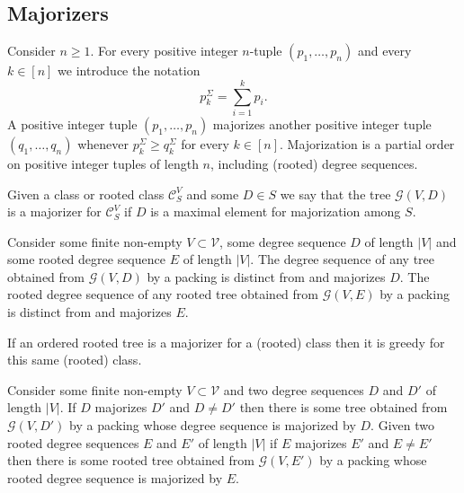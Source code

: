 \documentclass[11 pt]{modarticle}
\newcommand{\vset}{\mathcal{V}}
\newcommand{\size}[1]{|#1|}
\newcommand{\tclass}{\mathcal{C}}
\newcommand{\greedy}[2]{\mathcal{G}(#1,#2)}
\newcommand{\pclass}[2]{\tclass^{#1}_{#2}}
\begin{document}
\subsection{Majorizers}\label{section:majorization}

Consider $n \geq 1$. For every positive integer $n$-tuple $(p_1, \dots, p_n)$ and every $k \in [n]$ we introduce the notation
\begin{equation*}
	p^{\Sigma}_k = \underset{i=1}{\overset{k}{\sum}} p_i.
\end{equation*}
A positive integer tuple $(p_1, \dots, p_n)$ majorizes another positive integer tuple $(q_1, \dots, q_n)$ whenever $p^{\Sigma}_k \geq q^{\Sigma}_k$ for every $k \in [n]$. Majorization is a partial order on positive integer tuples of length $n$, including (rooted) degree sequences.%


\begin{defi}
Given a class or rooted class $\pclass{V}{S}$ and some $D \in S$ we say that the tree $\greedy{V}{D}$ is a majorizer for $\pclass{V}{S}$ if $D$ is a maximal element for majorization among $S$.
\end{defi}

\begin{rem}\label{rem:majorization}
Consider some finite non-empty $V \subset \vset$, some degree sequence $D$ of length $\size{V}$ and some rooted degree sequence $E$ of length $\size{V}$. The degree sequence of any tree obtained from $\greedy{V}{D}$ by a packing is distinct from and majorizes $D$. The rooted degree sequence of any rooted tree obtained from $\greedy{V}{E}$ by a packing is distinct from and majorizes $E$. 
\end{rem}

\begin{cor}\label{cor:majorization}
If an ordered rooted tree is a majorizer for a (rooted) class then it is greedy for this same (rooted) class.
\end{cor}

\begin{prop}\label{prop:majorization}
Consider some finite non-empty $V \subset \vset$ and two degree sequences $D$ and $D'$ of length $\size{V}$. If $D$ majorizes $D'$ and $D \neq D'$ then there is some tree obtained from $\greedy{V}{D'}$ by a packing whose degree sequence is majorized by $D$. Given two rooted degree sequences $E$ and $E'$ of length $\size{V}$ if $E$ majorizes $E'$ and $E \neq E'$ then there is some rooted tree obtained from $\greedy{V}{E'}$ by a packing whose rooted degree sequence is majorized by $E$.
\end{prop}
\end{document}
